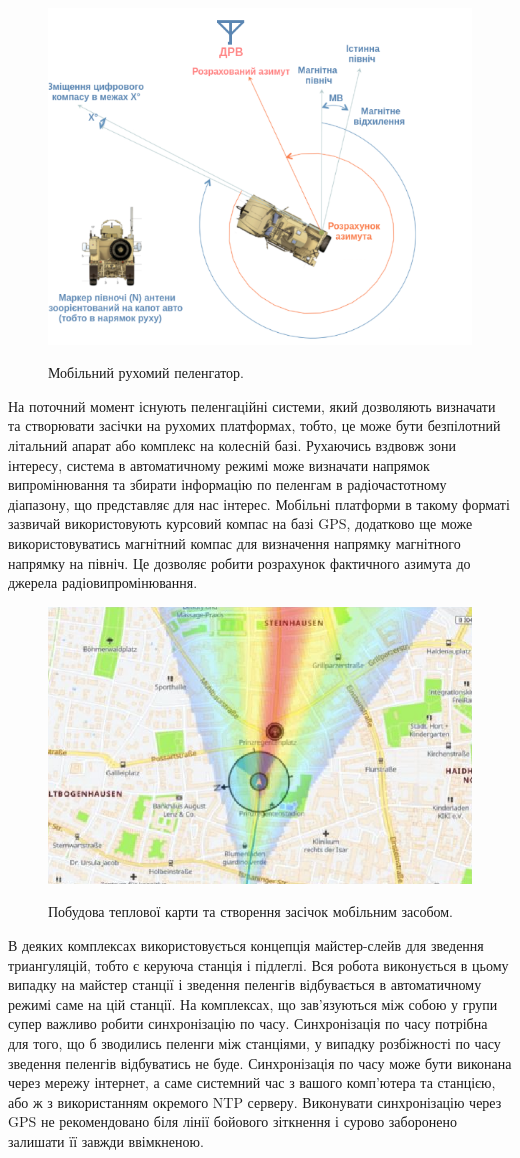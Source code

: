 \documentclass{article}
\begin{document}
\begin{figure}[H]
	\centering
	{\includegraphics[width=0.6\linewidth]{images/mobile_df.png}}
	\caption{\label{fig:triangulations} Мобільний рухомий пеленгатор.}
\end{figure}


На поточний момент існують пеленгаційні системи, який дозволяють визначати та створювати засічки на рухомих платформах, тобто, це може бути безпілотний літальний апарат або комплекс на колесній базі.
Рухаючись вздвовж зони інтересу, система в автоматичному режимі може визначати напрямок випромінювання та збирати інформацію по пеленгам в радіочастотному діапазону, що представляє для нас інтерес. Мобільні платформи в такому форматі зазвичай використовують курсовий компас на базі GPS, додатково ще може використовуватись магнітний компас для визначення напрямку магнітного напрямку на північ. Це дозволяє робити розрахунок фактичного азимута до джерела радіовипромінювання. 

\begin{figure}[H]
	\centering
	{\includegraphics[width=0.6\linewidth]{images/heatmap-df.png}}
	\caption{\label{fig:triangulations} Побудова теплової карти та створення засічок мобільним засобом.}
\end{figure}

В деяких комплексах використовується концепція майстер-слейв для зведення триангуляцій, тобто є керуюча станція і підлеглі. Вся робота виконується в цьому випадку на майстер станції і зведення пеленгів відбувається в автоматичному режимі саме на цій станції. На комплексах, що зав'язуються між собою у групи супер важливо робити синхронізацію по часу. Синхронізація по часу потрібна для того, що б зводились пеленги між станціями, у випадку розбіжності по часу зведення пеленгів відбуватись не буде. Синхронізація по часу може бути виконана через мережу інтернет, а саме системний час з вашого комп'ютера та станцією, або ж з використанням окремого NTP серверу. Виконувати синхронізацію через GPS не рекомендовано біля лінії бойового зіткнення і сурово заборонено залишати її завжди ввімкненою.
\end{document}
